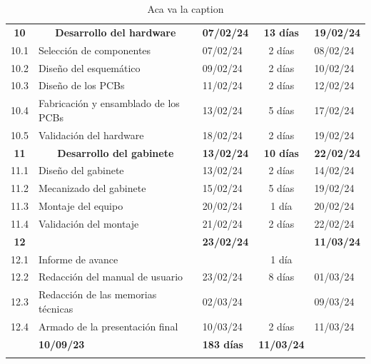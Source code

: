 \documentclass[
11pt, %
]{charter}
\begin{document}
\begin{longtable}[c]{|cllcl|}
	\rowcolor[HTML]{ECF4FF} 
	\textbf{10} & \multicolumn{1}{c}{\cellcolor[HTML]{ECF4FF}\textbf{Desarrollo del hardware}} & \multicolumn{1}{c}{\cellcolor[HTML]{ECF4FF}\textbf{07/02/24}} & \textbf{13 días} & \multicolumn{1}{c|}{\cellcolor[HTML]{ECF4FF}\textbf{19/02/24}} \\
	10.1 & Selección de componentes & 07/02/24 & 2 días & 08/02/24 \\
	\rowcolor[HTML]{EFEFEF} 
	10.2 & Diseño del esquemático & 09/02/24 & 2 días & 10/02/24 \\
	10.3 & Diseño de los PCBs & 11/02/24 & 2 días & 12/02/24 \\
	\rowcolor[HTML]{EFEFEF} 
	10.4 & Fabricación y ensamblado de los PCBs & 13/02/24 & 5 días & 17/02/24 \\
	10.5 & Validación del hardware & 18/02/24 & 2 días & 19/02/24 \\
	\rowcolor[HTML]{ECF4FF} 
	\textbf{11} & \multicolumn{1}{c}{\cellcolor[HTML]{ECF4FF}\textbf{Desarrollo del gabinete}} & \textbf{13/02/24} & \textbf{10 días} & \textbf{22/02/24} \\
	11.1 & Diseño del gabinete & 13/02/24 & 2 días & 14/02/24 \\
	\rowcolor[HTML]{EFEFEF} 
	11.2 & Mecanizado del gabinete & 15/02/24 & 5 días & 19/02/24 \\
	11.3 & Montaje del equipo & 20/02/24 & 1 día & 20/02/24 \\
	\rowcolor[HTML]{EFEFEF} 
	11.4 & Validación del montaje & 21/02/24 & 2 días & 22/02/24 \\
	\rowcolor[HTML]{ECF4FF} 
	{\color[HTML]{000000} \textbf{12}} & \multicolumn{1}{c}{\cellcolor[HTML]{ECF4FF}{\color[HTML]{000000} \textbf{Documentación}}} & {\color[HTML]{000000} \textbf{23/02/24}} & {\color[HTML]{000000} \textbf{}} & {\color[HTML]{000000} \textbf{11/03/24}} \\
	12.1 & Informe de avance &  & 1 día &  \\
	\rowcolor[HTML]{EFEFEF} 
	12.2 & Redacción del manual de usuario & 23/02/24 & 8 días & 01/03/24 \\
	12.3 & Redacción de las memorias técnicas & 02/03/24 &  & 09/03/24 \\
	\rowcolor[HTML]{EFEFEF} 
	12.4 & Armado de la presentación final & 10/03/24 & 2 días & 11/03/24 \\ \hline
	\rowcolor[HTML]{DAE8FC} 
	\multicolumn{2}{|c}{\cellcolor[HTML]{DAE8FC}\textbf{Tiempo total}} & \textbf{10/09/23} & \multicolumn{1}{l}{\cellcolor[HTML]{DAE8FC}\textbf{183 días}} & \textbf{11/03/24} \\ \hline
	\caption{Aca va la caption}
	\label{tab:gantt-table}\\
\end{longtable}
\end{document}
